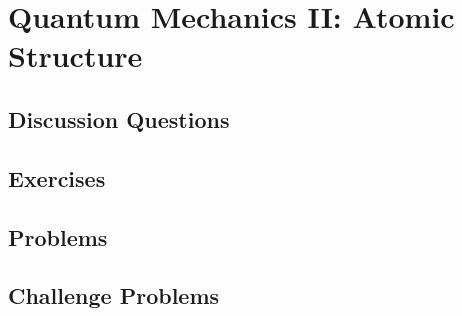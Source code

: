 
\chapter{Quantum Mechanics II: Atomic Structure}

\section{Discussion Questions}

\section{Exercises}

\section{Problems}

\section{Challenge Problems}
